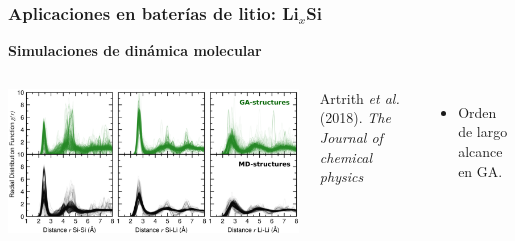\documentclass[aspectratio=169]{beamer}
\let\oldtextbf\textbf
\renewcommand{\textbf}[1]{\textcolor{nordblue}{\oldtextbf{#1}}}
\begin{document}
    \begin{frame}
        \frametitle{Aplicaciones en baterías de litio: Li$_x$Si}
        
        \textbf{Simulaciones de dinámica molecular}
        
        \begin{columns}
            \begin{center}
                \includegraphics[width=\columnwidth]{LiSi-rdfs.png}
            \end{center}
            \tiny{Artrith \textit{et al.} (2018). \textit{The Journal of chemical
            physics}}

            \begin{itemize}
                \item Orden de largo alcance en GA. 
            \end{itemize}
        \end{columns}
            
    \end{frame}
    
\end{document}
